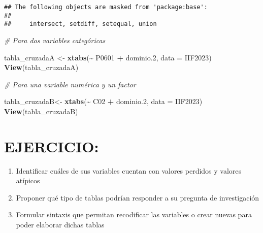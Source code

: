 \documentclass[
]{article}
\newenvironment{Shaded}{\begin{snugshade}}{\end{snugshade}}
\newcommand{\AttributeTok}[1]{\textcolor[rgb]{0.13,0.29,0.53}{#1}}
\newcommand{\CommentTok}[1]{\textcolor[rgb]{0.56,0.35,0.01}{\textit{#1}}}
\newcommand{\FloatTok}[1]{\textcolor[rgb]{0.00,0.00,0.81}{#1}}
\newcommand{\FunctionTok}[1]{\textcolor[rgb]{0.13,0.29,0.53}{\textbf{#1}}}
\newcommand{\NormalTok}[1]{#1}
\newcommand{\OtherTok}[1]{\textcolor[rgb]{0.56,0.35,0.01}{#1}}
\newcommand{\SpecialCharTok}[1]{\textcolor[rgb]{0.81,0.36,0.00}{\textbf{#1}}}
\providecommand{\tightlist}{%
  \setlength{\itemsep}{0pt}\setlength{\parskip}{0pt}}
\begin{document}
\begin{verbatim}
## The following objects are masked from 'package:base':
## 
##     intersect, setdiff, setequal, union
\end{verbatim}

\begin{Shaded}
\begin{Highlighting}[]
\CommentTok{\# Para dos variables categóricas}

\NormalTok{tabla\_cruzadaA }\OtherTok{\textless{}{-}} \FunctionTok{xtabs}\NormalTok{(}\SpecialCharTok{\textasciitilde{}}\NormalTok{ P0601 }\SpecialCharTok{+}\NormalTok{ dominio}\FloatTok{.2}\NormalTok{, }\AttributeTok{data =}\NormalTok{ IIF2023)}
\FunctionTok{View}\NormalTok{(tabla\_cruzadaA)}


\CommentTok{\# Para una variable numérica y un factor}

\NormalTok{tabla\_cruzadaB}\OtherTok{\textless{}{-}} \FunctionTok{xtabs}\NormalTok{(}\SpecialCharTok{\textasciitilde{}}\NormalTok{ C02 }\SpecialCharTok{+}\NormalTok{ dominio}\FloatTok{.2}\NormalTok{, }\AttributeTok{data =}\NormalTok{ IIF2023)}
\FunctionTok{View}\NormalTok{(tabla\_cruzadaB)}
\end{Highlighting}
\end{Shaded}

\hypertarget{ejercicio}{%
\section{EJERCICIO:}\label{ejercicio}}

\begin{enumerate}
\def\labelenumi{\arabic{enumi}.}
\tightlist
\item
  Identificar cuáles de sus variables cuentan con valores perdidos y
  valores atípicos
\item
  Proponer qué tipo de tablas podrían responder a su pregunta de
  investigación
\item
  Formular sintaxis que permitan recodificar las variables o crear
  nuevas para poder elaborar dichas tablas
\end{enumerate}
\end{document}
